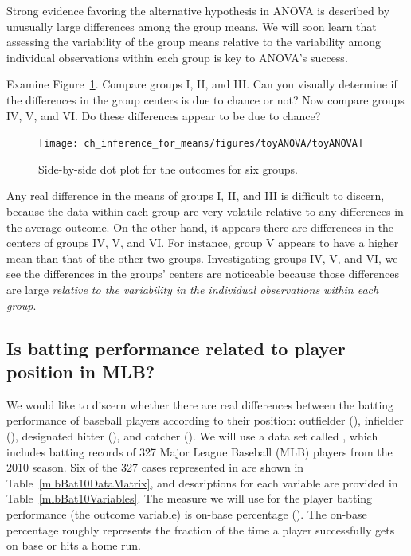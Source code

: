 Strong evidence favoring the alternative hypothesis in ANOVA is described by unusually large differences among the group means. We will soon learn that assessing the variability of the group means relative to the variability among individual observations within each group is key to ANOVA's success.

\begin{example}{Examine Figure~\ref{toyANOVA}. Compare groups I, II, and III. Can you visually determine if the differences in the group centers is due to chance or not? Now compare groups IV, V, and VI. Do these differences appear to be due to chance?}

\begin{figure}[h]
\centering
\texttt{[image: ch\_inference\_for\_means/figures/toyANOVA/toyANOVA]}
\caption{Side-by-side dot plot for the outcomes for six groups.}
\label{toyANOVA}
\end{figure}

Any real difference in the means of groups I, II, and III is difficult to discern, because the data within each group are very volatile relative to any differences in the average outcome. On the other hand, it appears there are differences in the centers of groups IV, V, and VI. For instance, group V appears to have a higher mean than that of the other two groups. Investigating groups IV, V, and VI, we see the differences in the groups' centers are noticeable because those differences are large \emph{relative to the variability in the individual observations within each group}.
\end{example}


\subsection{Is batting performance related to player position in MLB?}


We would like to discern whether there are real differences between the batting performance of baseball players according to their position: outfielder (), infielder (), designated hitter (), and catcher (). We will use a data set called , which includes batting records of 327 Major League Baseball (MLB) players from the 2010 season. Six of the 327 cases represented in  are shown in Table~\ref{mlbBat10DataMatrix}, and descriptions for each variable are provided in Table~\ref{mlbBat10Variables}. The measure we will use for the player batting performance (the outcome variable) is on-base percentage (). The on-base percentage roughly represents the fraction of the time a player successfully gets on base or hits a home run.

